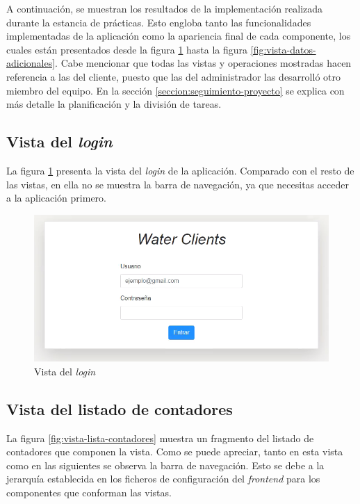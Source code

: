 \documentclass[pdftex,11pt,a4paper]{book}
\begin{document}
A continuación, se muestran los resultados de la implementación realizada durante la estancia de prácticas. Esto engloba tanto las funcionalidades implementadas de la aplicación como la apariencia final de cada componente, los cuales están presentados desde la figura \ref{fig:vista-login} hasta la figura \ref{fig:vista-datos-adicionales}. Cabe mencionar que todas las vistas y operaciones mostradas hacen referencia a las del cliente, puesto que las del administrador las desarrolló otro miembro del equipo. En la sección \ref{seccion:seguimiento-proyecto} se explica con más detalle la planificación y la división de tareas. 

\subsection{Vista del \textit{login}} \label{subseccion:vista-login}

La figura \ref{fig:vista-login} presenta la vista del \textit{login} de la aplicación. Comparado con el resto de las vistas, en ella no se muestra la barra de navegación, ya que necesitas acceder a la aplicación primero.

\begin{figure}[h]
 \centering
 \includegraphics [scale=0.75] {images/vistas/login.png}
 \caption{Vista del \textit{login}} \label{fig:vista-login}
 \end{figure}

\subsection{Vista del listado de contadores} \label{subseccion:vista-listado}

La figura \ref{fig:vista-lista-contadores}  muestra un fragmento del listado de contadores que componen la vista. Como se puede apreciar, tanto en esta vista como en las siguientes se observa la barra de navegación. Esto se debe a la jerarquía establecida en los ficheros de configuración del \textit{frontend} para los componentes que conforman las vistas.
\end{document}
